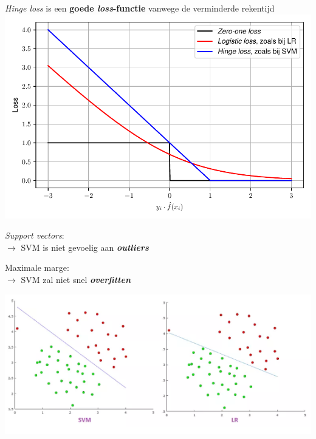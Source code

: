 \documentclass[kulak]{kulakposter}
\begin{document}
	\begin{multicols}{3}
		
		\vfill \null
		
		\begin{center}
		\textit{Hinge loss} is een \textbf{goede \textit{loss}-functie} vanwege de verminderde rekentijd\\
		\includegraphics[width=.99\columnwidth]{lossfuncties}
		\end{center}
		
		\columnbreak
		
		\vfill \null
		
		\textit{Support vectors}:\\ \(\rightarrow\) SVM is niet gevoelig aan \textit{\textbf{outliers}}
		
		Maximale marge:\\ \(\rightarrow\) SVM zal niet snel \textbf{\textit{overfitten}}\\
		
		\begin{center}
			\includegraphics[width=.99\columnwidth]{outlier}
		\end{center}
		

\end{multicols}
\end{document}

